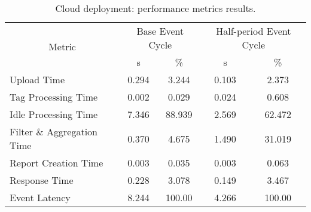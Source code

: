 \begin{table}[ht!]
\centering
\caption{Cloud deployment: performance metrics results.}
\label{table:cloud_metrics}
\begin{tabular}{|l|c|c|c|c|}
\hline
\multicolumn{1}{|c|}{\multirow{2}{*}{Metric}} & \multicolumn{2}{c|}{Base Event Cycle} & \multicolumn{2}{c|}{Half-period Event Cycle} \\
\multicolumn{1}{|c|}{}                        & s                 & \%                & s                    & \%                    \\ \hline
Upload Time                                   & 0.294             & 3.244             & 0.103                & 2.373                 \\ \hline
Tag Processing Time                           & 0.002             & 0.029             & 0.024                & 0.608                 \\ \hline
Idle Processing Time                          & 7.346             & 88.939            & 2.569                & 62.472                \\ \hline
Filter \& Aggregation Time                    & 0.370             & 4.675             & 1.490                & 31.019                \\ \hline
Report Creation Time                          & 0.003             & 0.035             & 0.003                & 0.063                 \\ \hline
Response Time                                 & 0.228             & 3.078             & 0.149                & 3.467                 \\ \hline
Event Latency                                 & 8.244             & 100.00            & 4.266                & 100.00                \\ \hline
\end{tabular}
\end{table}
